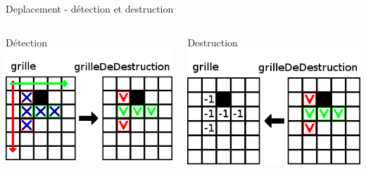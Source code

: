\begin{frame}{Deplacement - détection et destruction}
	\begin{columns}
		\begin{column}{0.49\textwidth}
			\begin{block}{Détection}
				\includegraphics[width=\textwidth]{imgs/Detection}
			\end{block}
		\end{column}
		\begin{column}{0.49\textwidth}
			\begin{block}{Destruction}
				\includegraphics[width=\textwidth]{imgs/Destruction}
			\end{block}
		\end{column}
	\end{columns}
\end{frame}

